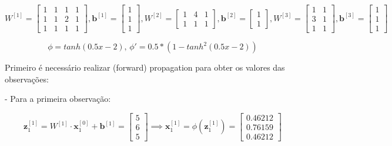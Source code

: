 \documentclass[a4paper,12pt]{article} %
\begin{document}
\begin{enumerate}
\begin{equation*}
    W^{[1]} = \begin{bmatrix} 1 & 1 & 1 & 1 \\ 1 & 1 & 2 & 1 \\ 1 & 1 & 1 & 1 \end{bmatrix} , \textbf{b}^{[1]} = \begin{bmatrix} 1 \\ 1 \\ 1 \end{bmatrix}, W^{[2]} = \begin{bmatrix} 1 & 4 & 1 \\  1 & 1 & 1 \end{bmatrix} , \textbf{b}^{[2]} = \begin{bmatrix} 1 \\ 1 \end{bmatrix}, W^{[3]} = \begin{bmatrix} 1 & 1 \\ 3 & 1 \\ 1 & 1 \end{bmatrix} , \textbf{b}^{[3]} = \begin{bmatrix} 1 \\ 1 \\ 1 \end{bmatrix}
\end{equation*}

\begin{equation*}
    \phi = tanh(0.5x -2) \text{, } \phi' = 0.5 * (1 - tanh^2(0.5x -2))
\end{equation*}





Primeiro é necessário realizar (forward) propagation para obter os valores das observações:

- Para a primeira observação:

\begin{equation*}
    \textbf{z}^{[1]}_1 = W^{[1]} \cdot \textbf{x}^{[0]}_1 + \textbf{b}^{[1]} = \begin{bmatrix} 5 \\ 6 \\ 5 \end{bmatrix} \implies \textbf{x}^{[1]}_1 = \phi(\textbf{z}^{[1]}_1)= \begin{bmatrix} 0.46212 \\ 0.76159 \\ 0.46212 \end{bmatrix}
\end{equation*}


\end{enumerate}
\end{document}
